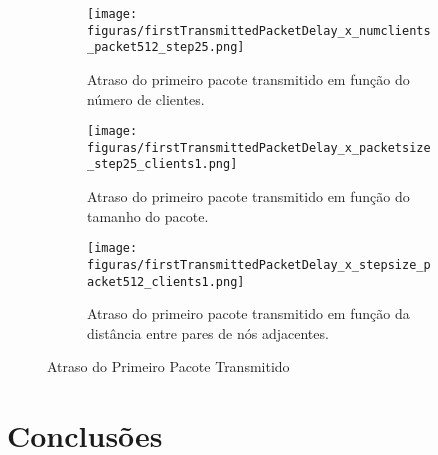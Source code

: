 \documentclass[letterpaper, 10 pt, conference]{ieeeconf}  %
\begin{document}
\begin{figure*}[!ht]
\centering
   \begin{subfigure}[b]{0.30\textwidth}
        \texttt{[image: figuras/firstTransmittedPacketDelay\_x\_numclients\_packet512\_step25.png]}
        \caption{Atraso do primeiro pacote transmitido em função do número de clientes.}
        \label{fig:firstTransmittedPacketDelayxnumClients}
    \end{subfigure}
       \begin{subfigure}[b]{0.30\textwidth}
        \texttt{[image: figuras/firstTransmittedPacketDelay\_x\_packetsize\_step25\_clients1.png]}
        \caption{Atraso do primeiro pacote transmitido em função do tamanho do pacote.}
        \label{fig:firstTransmittedPacketDelayxpacketSize}
    \end{subfigure}
       \begin{subfigure}[b]{0.30\textwidth}
        \texttt{[image: figuras/firstTransmittedPacketDelay\_x\_stepsize\_packet512\_clients1.png]}
        \caption{Atraso do primeiro pacote transmitido em função da distância entre pares de nós adjacentes.}
        \label{fig:firstTransmittedPacketDelayxstepSize}
    \end{subfigure}
\caption{Atraso do Primeiro Pacote Transmitido}
\label{fig:firstTransmittedPacketDelay}
\end{figure*}



\section{Conclusões}\label{sec:conc}
\end{document}
